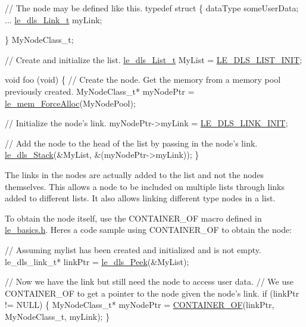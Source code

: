\begin{DoxyCode}
\textcolor{comment}{// The node may be defined like this.}
\textcolor{keyword}{typedef} \textcolor{keyword}{struct}
\{
     dataType someUserData;
     ...
     \hyperlink{structle__dls___link__t}{le\_dls\_Link\_t} myLink;

\}
MyNodeClass\_t;

\textcolor{comment}{// Create and initialize the list.}
\hyperlink{structle__dls___list__t}{le\_dls\_List\_t} MyList = \hyperlink{le__doubly_linked_list_8h_a68f28b61cdfd004591f24730b4d5a740}{LE\_DLS\_LIST\_INIT};

\textcolor{keywordtype}{void} foo (\textcolor{keywordtype}{void})
\{
    \textcolor{comment}{// Create the node.  Get the memory from a memory pool previously created.}
    MyNodeClass\_t* myNodePtr = \hyperlink{le__mem_8h_af7c289c73d4182835a26a9099f3db359}{le\_mem\_ForceAlloc}(MyNodePool);

    \textcolor{comment}{// Initialize the node's link.}
    myNodePtr->myLink = \hyperlink{le__doubly_linked_list_8h_a616b17e10af5ce6dcc49e34b6ab927c2}{LE\_DLS\_LINK\_INIT};

    \textcolor{comment}{// Add the node to the head of the list by passing in the node's link.}
    \hyperlink{le__doubly_linked_list_8h_a90f9072a55ef0cb573bbdad91e34d368}{le\_dls\_Stack}(&MyList, &(myNodePtr->myLink));
\}
\end{DoxyCode}


The links in the nodes are actually added to the list and not the nodes themselves. This allows a node to be included on multiple lists through links added to different lists. It also allows linking different type nodes in a list.

To obtain the node itself, use the {\ttfamily C\+O\+N\+T\+A\+I\+N\+E\+R\+\_\+\+O\+F} macro defined in \hyperlink{le__basics_8h}{le\+\_\+basics.\+h}. Here\textquotesingle{}s a code sample using C\+O\+N\+T\+A\+I\+N\+E\+R\+\_\+\+O\+F to obtain the node\+:


\begin{DoxyCode}
\textcolor{comment}{// Assuming mylist has been created and initialized and is not empty.}
le\_dls\_link\_t* linkPtr = \hyperlink{le__doubly_linked_list_8h_ab0a2a83f476727f6aa875e98b213f05c}{le\_dls\_Peek}(&MyList);

\textcolor{comment}{// Now we have the link but still need the node to access user data.}
\textcolor{comment}{// We use CONTAINER\_OF to get a pointer to the node given the node's link.}
\textcolor{keywordflow}{if} (linkPtr != NULL)
\{
    MyNodeClass\_t* myNodePtr = \hyperlink{le__basics_8h_a3616d3fd5b502150b643ddc769f71188}{CONTAINER\_OF}(linkPtr, MyNodeClass\_t, myLink);
\}
\end{DoxyCode}


